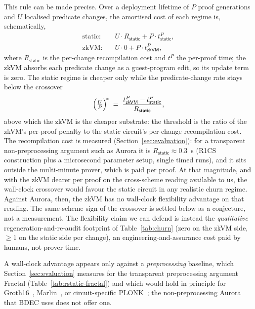 \noindent This rule can be made precise. Over a deployment lifetime of $P$ proof generations and $U$ localised predicate changes, the amortised cost of each regime is, schematically,
\begin{align}
  \text{static:}\quad & U\cdot R_{\mathsf{static}} + P\cdot t^{P}_{\mathsf{static}},
  \label{eq:static-cost}\\
  \text{zkVM:}\quad & U\cdot 0 + P\cdot t^{P}_{\mathsf{zkVM}},
  \label{eq:zkvm-cost}
\end{align}
where $R_{\mathsf{static}}$ is the per-change recompilation cost and $t^{P}$ the per-proof time; the zkVM absorbs each predicate change as a guest-program edit, so its update term is zero. The static regime is cheaper only while the predicate-change rate stays below the crossover
\begin{equation}
  \Bigl(\tfrac{U}{P}\Bigr)^{\!*} \;=\; \frac{t^{P}_{\mathsf{zkVM}}-t^{P}_{\mathsf{static}}}{R_{\mathsf{static}}},
  \label{eq:crossover}
\end{equation}
above which the zkVM is the cheaper substrate: the threshold is the ratio of the zkVM's per-proof penalty to the static circuit's per-change recompilation cost. The recompilation cost is measured (Section~\ref{sec:evaluation}): for a transparent non-preprocessing argument such as Aurora it is $R_{\mathsf{static}}\approx 0.3$~s (R1CS construction plus a microsecond parameter setup, single timed runs), and it sits outside the multi-minute prover, which is paid per proof. At that magnitude, and with the zkVM dearer per proof on the cross-scheme reading available to us, the wall-clock crossover would favour the static circuit in any realistic churn regime. Against Aurora, then, the zkVM has no wall-clock flexibility advantage on that reading. The same-scheme sign of the crossover is settled below as a conjecture, not a measurement. The flexibility claim we can defend is instead the \emph{qualitative} regeneration-and-re-audit footprint of Table~\ref{tab:churn} (zero on the zkVM side, $\geq 1$ on the static side per change), an engineering-and-assurance cost paid by humans, not prover time.

\noindent A wall-clock advantage appears only against a \emph{preprocessing} baseline, which Section~\ref{sec:evaluation} measures for the transparent preprocessing argument Fractal (Table~\ref{tab:rstatic-fractal}) and which would hold in principle for Groth16~\cite{groth2016}, Marlin~\cite{chiesa2020marlin}, or circuit-specific PLONK~\cite{gabizon2019plonk}; the non-preprocessing Aurora that BDEC uses does not offer one.

